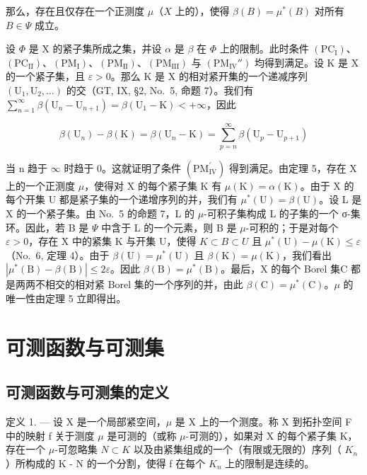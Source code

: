 那么，存在且仅存在一个正测度 \(\mu\)（\(X\) 上的），使得 \(\beta(B) = \mu^{*}(B)\) 对所有 \(B \in \Psi\) 成立。

设 \(\Phi\) 是 X 的紧子集所成之集，并设 \(\alpha\) 是 \(\beta\) 在 \(\Phi\) 上的限制。此时条件 \((\mathrm{PC_I})\)、\((\mathrm{PC_{II}})\)、\((\mathrm{PM_I})\)、\((\mathrm{PM_{II}})\)、\((\mathrm{PM_{III}})\) 与 \((\mathrm{PM_{IV}''})\) 均得到满足。设 K 是 X 的一个紧子集，且 \(\varepsilon > 0\)。那么 K 是 X 的相对紧开集的一个递减序列 \((\mathrm{U}_1, \mathrm{U}_2, \ldots)\) 的交（GT, IX, §2, No.~5, 命题 7）。我们有 \(\sum_{n=1}^{\infty} \beta(\mathrm{U}_n - \mathrm{U}_{n+1}) = \beta(\mathrm{U}_1 - \mathrm{K}) < +\infty\)，因此

\[
\beta (\mathrm{U} _ {n}) - \beta (\mathrm{K}) = \beta (\mathrm{U} _ {n} - \mathrm{K}) = \sum_ {p = n} ^ {\infty} \beta (\mathrm{U} _ {p} - \mathrm{U} _ {p + 1})
\]

当 n 趋于 \(\infty\) 时趋于 0。这就证明了条件 \((\mathrm{PM}_{\mathrm{IV}}^{\prime})\) 得到满足。由定理 5，存在 X 上的一个正测度 \(\mu\)，使得对 X 的每个紧子集 K 有 \(\mu(\mathrm{K}) = \alpha(\mathrm{K})\)。由于 X 的每个开集 U 都是紧子集的一个递增序列的并，我们有 \(\mu^{*}(\mathrm{U}) = \beta(\mathrm{U})\)。设 L 是 X 的一个紧子集。由 No.~5 的命题 7，L 的 \(\mu\)-可积子集构成 L 的子集的一个 σ-集环。因此，若 B 是 \(\Psi\) 中含于 L 的一个元素，则 B 是 \(\mu\)-可积的；于是对每个 \(\varepsilon > 0\)，存在 X 中的紧集 K 与开集 U，使得 \(K \subset B \subset U\) 且 \(\mu^{*}(\mathrm{U}) - \mu(\mathrm{K}) \leqslant \varepsilon\)（No.~6, 定理 4）。由于 \(\beta(\mathrm{U}) = \mu^{*}(\mathrm{U})\) 且 \(\beta(\mathrm{K}) = \mu(\mathrm{K})\)，我们看出 \(|\mu^{*}(\mathrm{B}) - \beta(\mathrm{B})| \leqslant 2\varepsilon\)。因此 \(\beta(\mathrm{B}) = \mu^{*}(\mathrm{B})\)。最后，X 的每个 Borel 集C 都是两两不相交的相对紧 Borel 集的一个序列的并，由此 \(\beta(\mathrm{C}) = \mu^{*}(\mathrm{C})\)。\(\mu\) 的唯一性由定理 5 立即得出。

\section{可测函数与可测集}

\subsection{可测函数与可测集的定义}

定义 1. --- 设 X 是一个局部紧空间，\(\mu\) 是 X 上的一个测度。称 X 到拓扑空间 F 中的映射 f 关于测度 \(\mu\) 是可测的（或称 \(\mu\)-可测的），如果对 X 的每个紧子集 K，存在一个 \(\mu\)-可忽略集 \(N \subset K\) 以及由紧集组成的一个（有限或无限的）序列（ \(K_{n}\) ）所构成的 K - N 的一个分割，使得 f 在每个 \(K_{n}\) 上的限制是连续的。

